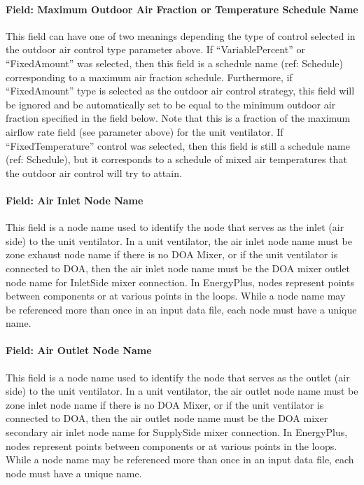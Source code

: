 \paragraph{Field: Maximum Outdoor Air Fraction or Temperature Schedule Name}\label{field-maximum-outdoor-air-fraction-or-temperature-schedule-name-000}

This field can have one of two meanings depending the type of control selected in the outdoor air control type parameter above. If ``VariablePercent'' or ``FixedAmount'' was selected, then this field is a schedule name (ref: Schedule) corresponding to a maximum air fraction schedule. Furthermore, if ``FixedAmount'' type is selected as the outdoor air control strategy, this field will be ignored and be automatically set to be equal to the minimum outdoor air fraction specified in the field below. Note that this is a fraction of the maximum airflow rate field (see parameter above) for the unit ventilator. If ``FixedTemperature'' control was selected, then this field is still a schedule name (ref: Schedule), but it corresponds to a schedule of mixed air temperatures that the outdoor air control will try to attain.

\paragraph{Field: Air Inlet Node Name}\label{field-air-inlet-node-name-1-007}

This field is a node name used to identify the node that serves as the inlet (air side) to the unit ventilator. In a unit ventilator, the air inlet node name must be zone exhaust node name if there is no DOA Mixer, or if the unit ventilator is connected to DOA, then the air inlet node name must be the DOA mixer outlet node name for InletSide mixer connection. In EnergyPlus, nodes represent points between components or at various points in the loops. While a node name may be referenced more than once in an input data file, each node must have a unique name.

\paragraph{Field: Air Outlet Node Name}\label{field-air-outlet-node-name-1-006}

This field is a node name used to identify the node that serves as the outlet (air side) to the unit ventilator. In a unit ventilator, the air outlet node name must be zone inlet node name if there is no DOA Mixer, or if the unit ventilator is connected to DOA, then the air outlet node name must be the DOA mixer secondary air inlet node name for SupplySide mixer connection. In EnergyPlus, nodes represent points between components or at various points in the loops. While a node name may be referenced more than once in an input data file, each node must have a unique name.

